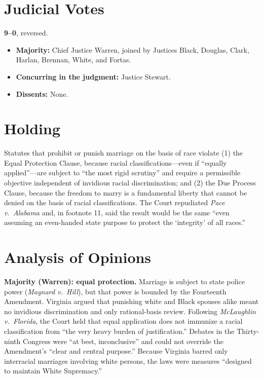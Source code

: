\documentclass[12pt]{article}
\begin{document}
\section{Judicial Votes}

\textbf{9--0}, reversed.
\begin{itemize}
\item \textbf{Majority:} Chief Justice Warren, joined by Justices Black, Douglas, Clark, Harlan, Brennan, White, and Fortas.
\item \textbf{Concurring in the judgment:} Justice Stewart.
\item \textbf{Dissents:} None.
\end{itemize}

\section{Holding}

Statutes that prohibit or punish marriage on the basis of race violate (1) the Equal Protection Clause, because racial classifications---even if ``equally applied''---are subject to ``the most rigid scrutiny'' and require a permissible objective independent of invidious racial discrimination; and (2) the Due Process Clause, because the freedom to marry is a fundamental liberty that cannot be denied on the basis of racial classifications. The Court repudiated \textit{Pace v.\ Alabama} and, in footnote 11, said the result would be the same ``even assuming an even-handed state purpose to protect the `integrity' of all races.''

\section{Analysis of Opinions}

\textbf{Majority (Warren): equal protection.} Marriage is subject to state police power (\textit{Maynard v.\ Hill}), but that power is bounded by the Fourteenth Amendment. Virginia argued that punishing white and Black spouses alike meant no invidious discrimination and only rational-basis review. Following \textit{McLaughlin v.\ Florida}, the Court held that equal application does not immunize a racial classification from ``the very heavy burden of justification.'' Debates in the Thirty-ninth Congress were ``at best, inconclusive'' and could not override the Amendment's ``clear and central purpose.'' Because Virginia barred only interracial marriages involving white persons, the laws were measures ``designed to maintain White Supremacy.''
\end{document}
